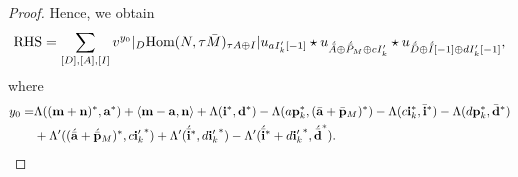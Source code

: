 \documentclass[reqno,12pt]{amsart}
\numberwithin{equation}{section}
\def\lr#1{\langle #1\rangle} \def\fin{\hfill$\square$}  \def\lra{\longrightarrow} \def\mod{\mbox{\rm \textbf{mod}}\,}\def\Mod{\mbox{\rm mod}\,}\def\top{\mbox{\rm top}\,}\def\soc{\mbox{\rm soc}\,}
\theoremstyle{plain} %
\theoremstyle{definition} %
\begin{document}
\begin{proof}
Hence, we obtain
\begin{align}\label{youshoubian}
{\rm RHS}=\sum_{[D],[A],[I]}v^{y_0}|_D\mbox{\rm Hom}(N,\tau \bar{M})_{\tau A\oplus I}|u_{aI_k'[-1]}\star u_{\acute{\bar{A}}\oplus \acute{\bar{P}}_M\oplus cI_k'}\star u_{\acute{\bar{D}}\oplus \acute{\bar{I}}[-1]\oplus dI_k'[-1]},
\end{align}
where
\begin{align*}
y_0=&\Lambda(({\bf m}+{\bf n})^\ast, {\bf a}^\ast)+\lr{{\bf m}-{\bf a},{\bf n}}+\Lambda({\bf i}^\ast,{\bf d}^\ast)-\Lambda(a{\bf p}_k^\ast,(\bar{\bf a}+\bar{\bf p}_M)^\ast)-\Lambda(c{\bf i}_k^\ast,\bar{\bf i}^\ast)-\Lambda(d{\bf p}_k^\ast, \bar{\bf d}^\ast)\\
&+\Lambda'((\acute{\bar{\mathbf{a}}}+\acute{\bar{\mathbf{p}}}_M)^\ast,c{{\bf i}_k'}^\ast)+\Lambda'(\acute{\bar{\mathbf{i} }}^\ast,d{{\bf i}_k'}^\ast)-\Lambda'(\acute{\bar{\mathbf{i}}}^\ast+d{{\bf i}_k'}^\ast,{\acute{\bar{\mathbf{d} }}}^\ast).
\end{align*}


\end{proof}
\end{document}
